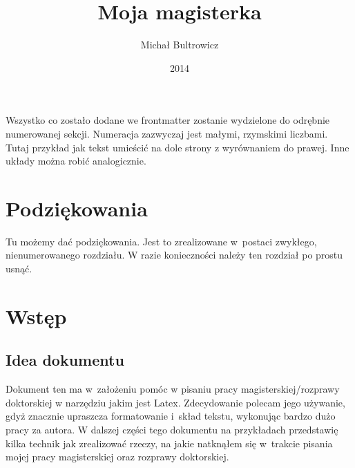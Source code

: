 \documentclass[twoside,a4paper]{book}
\title{Moja magisterka}
\author{Michał Bultrowicz}
\date{2014}
\begin{document}
\frontmatter
\maketitle
\tableofcontents

\newpage
\null
\vfill
\begin{flushright}
  Wszystko co zostało dodane we frontmatter zostanie wydzielone do odrębnie numerowanej sekcji. Numeracja zazwyczaj jest małymi, rzymskimi liczbami. Tutaj przykład jak tekst umieścić na dole strony z wyrównaniem do prawej. Inne układy można robić analogicznie.
\end{flushright}

\chapter*{Podziękowania}
Tu możemy dać podziękowania. Jest to zrealizowane w~postaci zwykłego, nienumerowanego rozdziału. W razie konieczności należy ten rozdział po prostu usnąć.

\mainmatter

\chapter{Wstęp}
\section{Idea dokumentu}

Dokument ten ma w~założeniu pomóc w pisaniu pracy magisterskiej/rozprawy doktorskiej w narzędziu jakim jest Latex. Zdecydowanie polecam jego używanie, gdyż znacznie upraszcza formatowanie i~skład tekstu, wykonując bardzo dużo pracy za autora. W dalszej części tego dokumentu na przykładach przedstawię kilka technik jak zrealizować rzeczy, na jakie natknąłem się w~trakcie pisania mojej pracy magisterskiej oraz rozprawy doktorskiej.
\end{document}
